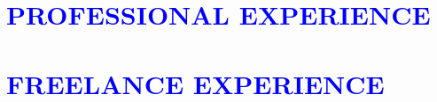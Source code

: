 \section{\texorpdfstring{\textcolor{blue}{PROFESSIONAL EXPERIENCE \textcolor{black}{\hrulefill}}}{PROFESSIONAL EXPERIENCE}}
\vspace{-8pt}\hspace{4pt}
\section{\texorpdfstring{\textcolor{blue}{FREELANCE EXPERIENCE \textcolor{black}{\hrulefill}}}{FREELANCE EXPERIENCE}}
\vspace{-8pt}\hspace{4pt}
% 
% 